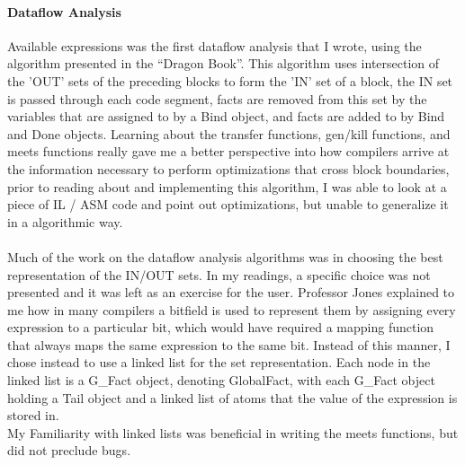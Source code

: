 \documentclass[14pt]{article}
\begin{document}
\paragraph{Dataflow Analysis}
Available expressions was the first dataflow analysis that I wrote, using the algorithm presented in the ``Dragon Book''. This algorithm uses intersection of the 'OUT' sets of the preceding blocks to form the 'IN' set of a block, the IN set is passed through each code segment, facts are removed from this set by the variables that are assigned to by a Bind object, and facts are added to by Bind and Done objects. Learning about the transfer functions, gen/kill functions, and meets functions really gave me a better perspective into how compilers arrive at the information necessary to perform optimizations that cross block boundaries, prior to reading about and implementing this algorithm, I was able to look at a piece of IL / ASM code and point out optimizations, but unable to generalize it in a algorithmic way.
\paragraph{}
Much of the work on the dataflow analysis algorithms was in choosing the best representation of the IN/OUT sets. In my readings, a specific choice was not presented and it was left as an exercise for the user. Professor Jones explained to me how in many compilers a bitfield is used to represent them by assigning every expression to a particular bit, which would have required a mapping function that always maps the same expression to the same bit. Instead of this manner, I chose instead to use a linked list for the set representation. Each node in the linked list is a G\_Fact object, denoting GlobalFact, with each G\_Fact object holding a Tail object and a linked list of atoms that the value of the expression is stored in.\\My Familiarity with linked lists was beneficial in writing the meets functions, but did not preclude bugs.
\end{document}
